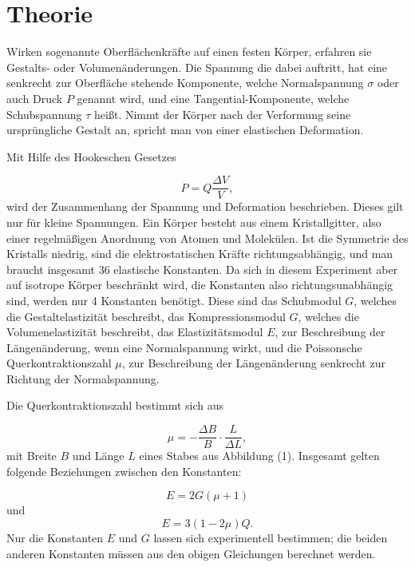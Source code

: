 \section{Theorie}
\label{sec:Theorie}



Wirken sogenannte Oberflächenkräfte auf einen festen Körper,
erfahren sie Gestalts- oder Volumenänderungen. Die Spannung
die dabei auftritt, hat eine senkrecht zur Oberfläche stehende Komponente, welche
Normalspannung $\sigma$ oder auch Druck $P$ genannt wird, und
eine Tangential-Komponente, welche Schubspannung $\tau$ heißt.
Nimmt der Körper nach der Verformung seine ursprüngliche Gestalt an, spricht
man von einer elastischen Deformation.  

\noindent Mit Hilfe des Hookeschen Gesetzes

\begin{equation}
  P = Q \frac{\Delta V}{V} ,
\end{equation}
wird der Zusammenhang  der Spannung und Deformation beschrieben.
Dieses gilt nur für kleine Spannungen. 
Ein Körper besteht aus einem Kristallgitter, also einer regelmäßigen Anordnung von Atomen und Molekülen.
Ist die Symmetrie des Kristalls niedrig, sind die elektrostatischen Kräfte richtungsabhängig, und man braucht insgesamt 36 elastische Konstanten.
Da sich in diesem Experiment aber auf isotrope Körper beschränkt wird, die Konstanten also richtungsunabhängig sind, werden nur 4 Konstanten benötigt.
Diese sind das Schubmodul $G$, welches die Gestaltelastizität beschreibt,
das Kompressionsmodul $G$, welches die Volumenelastizität beschreibt, das Elastizitätsmodul $E$, zur 
Beschreibung der Längenänderung, wenn eine Normalspannung wirkt, und die Poissonsche Querkontraktionszahl $\mu$, zur Beschreibung der 
Längenänderung senkrecht zur Richtung der Normalspannung.

\noindent Die Querkontraktionszahl bestimmt sich aus

\begin{equation}
\mu = - \frac{\Delta B}{B}\cdot \frac{L}{\Delta L} ,
\end{equation}
mit Breite $B$ und Länge $L$ eines Stabes aus Abbildung (1).
Insgesamt gelten folgende Beziehungen zwischen den Konstanten:

\begin{equation}
  E = 2G(\mu + 1) 
\end{equation}
und
\begin{equation}
  E = 3 (1-2\mu)Q .
\end{equation}
Nur die Konstanten $E$ und $G$ lassen sich experimentell bestimmen; die beiden anderen Konstanten 
müssen aus den obigen Gleichungen berechnet werden. 

